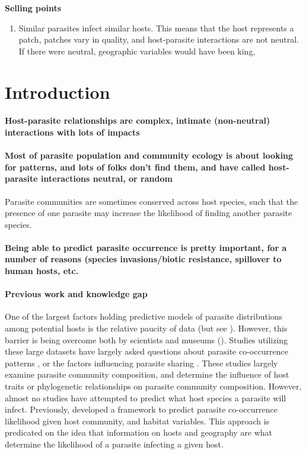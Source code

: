\documentclass[12pt]{article}
\begin{document}
\textbf{Selling points} \\
\begin{enumerate}
 \item Similar parasites infect similar hosts. This means that the host represents a patch, patches vary in quality, and host-parasite interactions are not neutral. If there were neutral, geographic variables would have been king, 
 
 
\end{enumerate}



\section{Introduction}
 \paragraph{Host-parasite relationships are complex, intimate (non-neutral) interactions with lots of impacts}
 
 
 \paragraph{Most of parasite population and community ecology is about looking for patterns, and lots of folks don't find them, and have called host-parasite interactions neutral, or random}
 Parasite communities are sometimes conserved across host species, such that the presence of one parasite may increase the likelihood of finding another parasite species.
 
 \paragraph{Being able to predict parasite occurrence is pretty important, for a number of reasons (species invasions/biotic resistance, spillover to human hosts, etc.}
 
 
 \paragraph{Previous work and knowledge gap}
  One of the largest factors holding predictive models of parasite distributions among potential hosts is the relative paucity of data (but see \cite{}). However, this barrier is being overcome both by scientists \cite{strona2012} and museums (\cite{NUNN}). Studies utilizing these large datasets have largely asked questions about parasite co-occurrence patterns \cite{strona2013}, or the factors influencing parasite sharing \cite{braga2014, dallas2014b}. These studies largely examine parasite community composition, and determine the influence of host traits or phylogenetic relationships on parasite community composition. However, almost no studies have attempted to predict what host species a parasite will infect. Previously, \citet{strona2013} developed a framework to predict parasite co-occurrence likelihood given host community, and habitat variables. This approach is predicated on the idea that information on hosts and geography are what determine the likelihood of a parasite infecting a given host. 
\end{document}
